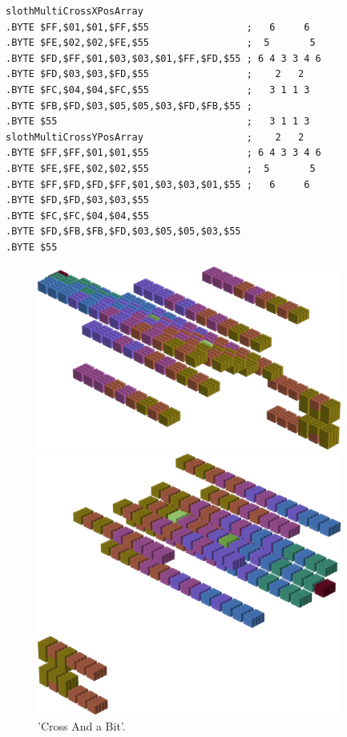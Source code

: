 \begin{minipage}[b]{0.48\linewidth}
\begin{lrbox}{\mybox}%
\begin{lstlisting}[basicstyle=\ttfamily\tiny,escapechar=\%]
slothMultiCrossXPosArray
.BYTE $FF,$01,$01,$FF,$55                 ;   6     6  
.BYTE $FE,$02,$02,$FE,$55                 ;  5       5 
.BYTE $FD,$FF,$01,$03,$03,$01,$FF,$FD,$55 ; 6 4 3 3 4 6
.BYTE $FD,$03,$03,$FD,$55                 ;    2   2   
.BYTE $FC,$04,$04,$FC,$55                 ;   3 1 1 3  
.BYTE $FB,$FD,$03,$05,$05,$03,$FD,$FB,$55 ;            
.BYTE $55                                 ;   3 1 1 3  
slothMultiCrossYPosArray                  ;    2   2   
.BYTE $FF,$FF,$01,$01,$55                 ; 6 4 3 3 4 6
.BYTE $FE,$FE,$02,$02,$55                 ;  5       5 
.BYTE $FF,$FD,$FD,$FF,$01,$03,$03,$01,$55 ;   6     6  
.BYTE $FD,$FD,$03,$03,$55
.BYTE $FC,$FC,$04,$04,$55
.BYTE $FD,$FB,$FB,$FD,$03,$05,$05,$03,$55
.BYTE $55
\end{lstlisting}
\end{lrbox}%
\scalebox{0.8}{\usebox{\mybox}}

\end{minipage}
%
\begin{minipage}[b]{0.48\linewidth}
\begin{figure}[H]
    \centering
    \begin{adjustbox}{width=5cm,margin=0cm 0cm}
      \includegraphics[width=10cm]{src/colorspace_patterns/pattern6-45.png}%
    \end{adjustbox}
    \begin{adjustbox}{width=5cm,margin=0cm 0cm}
      \includegraphics[width=10cm]{src/colorspace_patterns/pattern6-225.png}%
    \end{adjustbox}
\caption{'Cross And a Bit'.}
\end{figure}
\end{minipage}
